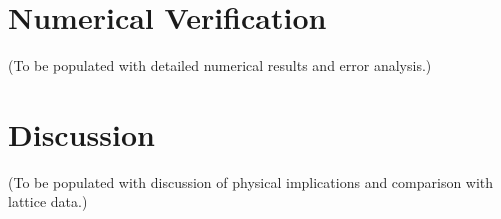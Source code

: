\documentclass[aps,prd,twocolumn,superscriptaddress,nofootinbib,10pt]{revtex4-2}
\begin{document}
\section{Numerical Verification}
(To be populated with detailed numerical results and error analysis.)

\section{Discussion}
(To be populated with discussion of physical implications and comparison with lattice data.)
\end{document}
